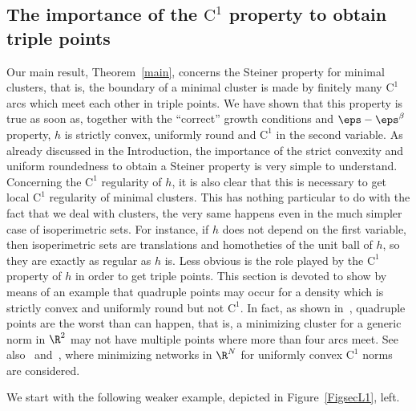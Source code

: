\subsection{The importance of the $\mathrm{C}^1$ property to obtain triple points\label{caseL1}}

Our main result, Theorem~\ref{main}, concerns the Steiner property for minimal clusters, that is, the boundary of a minimal cluster is made by finitely many $\mathrm{C}^1$ arcs which meet each other in triple points. We have shown that this property is true as soon as, together with the ``correct'' growth conditions and $\eps-\eps^\beta$ property, $h$ is strictly convex, uniformly round and $\mathrm{C}^1$ in the second variable. As already discussed in the Introduction, the importance of the strict convexity and uniform roundedness to obtain a Steiner property is very simple to understand. Concerning the $\mathrm{C}^1$ regularity of $h$, it is also clear that this is necessary to get local $\mathrm{C}^1$ regularity of minimal clusters. This has nothing particular to do with the fact that we deal with clusters, the very same happens even in the much simpler case of isoperimetric sets. For instance, if $h$ does not depend on the first variable, then isoperimetric sets are translations and homotheties of the unit ball of $h$, so they are exactly as regular as $h$ is. Less obvious is the role played by the $\mathrm{C}^1$ property of $h$ in order to get triple points. This section is devoted to show by means of an example that quadruple points may occur for a density which is strictly convex and uniformly round but not $\mathrm{C}^1$. In fact, as shown in~\cite{MFG}, quadruple points are the worst than can happen, that is, a minimizing cluster for a generic norm in $\R^2$ may not have multiple points where more than four arcs meet. See also~\cite{ACH,LM} and~\cite[Ch.\,10.10]{M1}, where minimizing networks in $\R^N$ for uniformly convex $\mathrm{C}^1$ norms are considered.

We start with the following weaker example, depicted in Figure~\ref{FigsecL1}, left.

